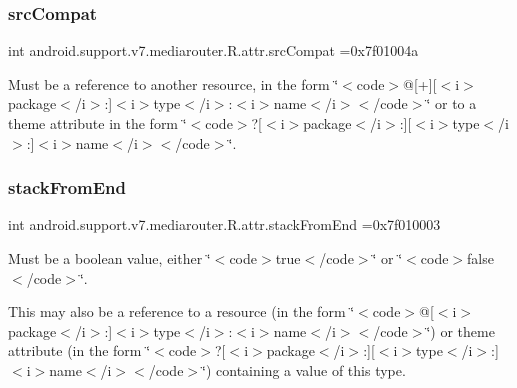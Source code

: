 \subsubsection{\texorpdfstring{src\+Compat}{srcCompat}}
{\footnotesize\ttfamily int android.\+support.\+v7.\+mediarouter.\+R.\+attr.\+src\+Compat =0x7f01004a\hspace{0.3cm}{\ttfamily [static]}}

Must be a reference to another resource, in the form \char`\"{}$<$code$>$@\mbox{[}+\mbox{]}\mbox{[}$<$i$>$package$<$/i$>$\+:\mbox{]}$<$i$>$type$<$/i$>$\+:$<$i$>$name$<$/i$>$$<$/code$>$\char`\"{} or to a theme attribute in the form \char`\"{}$<$code$>$?\mbox{[}$<$i$>$package$<$/i$>$\+:\mbox{]}\mbox{[}$<$i$>$type$<$/i$>$\+:\mbox{]}$<$i$>$name$<$/i$>$$<$/code$>$\char`\"{}. \mbox{\label{classandroid_1_1support_1_1v7_1_1mediarouter_1_1R_1_1attr_a26c262877113677509b313d3cc45bc3f}} 
\subsubsection{\texorpdfstring{stack\+From\+End}{stackFromEnd}}
{\footnotesize\ttfamily int android.\+support.\+v7.\+mediarouter.\+R.\+attr.\+stack\+From\+End =0x7f010003\hspace{0.3cm}{\ttfamily [static]}}

Must be a boolean value, either \char`\"{}$<$code$>$true$<$/code$>$\char`\"{} or \char`\"{}$<$code$>$false$<$/code$>$\char`\"{}. 

This may also be a reference to a resource (in the form \char`\"{}$<$code$>$@\mbox{[}$<$i$>$package$<$/i$>$\+:\mbox{]}$<$i$>$type$<$/i$>$\+:$<$i$>$name$<$/i$>$$<$/code$>$\char`\"{}) or theme attribute (in the form \char`\"{}$<$code$>$?\mbox{[}$<$i$>$package$<$/i$>$\+:\mbox{]}\mbox{[}$<$i$>$type$<$/i$>$\+:\mbox{]}$<$i$>$name$<$/i$>$$<$/code$>$\char`\"{}) containing a value of this type. \mbox{\label{classandroid_1_1support_1_1v7_1_1mediarouter_1_1R_1_1attr_af5c16e95162c3cece10441e854e43361}} 
